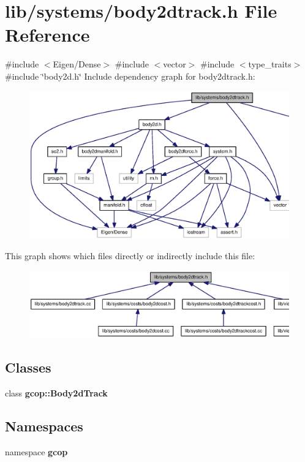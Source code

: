 \section{lib/systems/body2dtrack.h \-File \-Reference}
\label{body2dtrack_8h}
{\ttfamily \#include $<$\-Eigen/\-Dense$>$}\*
{\ttfamily \#include $<$vector$>$}\*
{\ttfamily \#include $<$type\-\_\-traits$>$}\*
{\ttfamily \#include \char`\"{}body2d.\-h\char`\"{}}\*
\-Include dependency graph for body2dtrack.\-h\-:
\nopagebreak
\begin{figure}[H]
\begin{center}
\leavevmode
\includegraphics[width=350pt]{body2dtrack_8h__incl}
\end{center}
\end{figure}
\-This graph shows which files directly or indirectly include this file\-:
\nopagebreak
\begin{figure}[H]
\begin{center}
\leavevmode
\includegraphics[width=350pt]{body2dtrack_8h__dep__incl}
\end{center}
\end{figure}
\subsection*{\-Classes}
\begin{DoxyCompactItemize}
\item 
class {\bf gcop\-::\-Body2d\-Track}
\end{DoxyCompactItemize}
\subsection*{\-Namespaces}
\begin{DoxyCompactItemize}
\item 
namespace {\bf gcop}
\end{DoxyCompactItemize}
